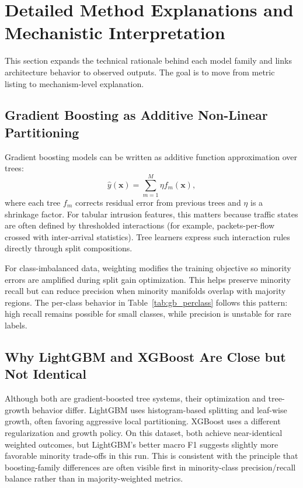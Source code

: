 \documentclass[10pt,journal]{IEEEtran}
\begin{document}
\section{Detailed Method Explanations and Mechanistic Interpretation}
This section expands the technical rationale behind each model family and links architecture behavior to observed outputs. The goal is to move from metric listing to mechanism-level explanation.

\subsection{Gradient Boosting as Additive Non-Linear Partitioning}
Gradient boosting models can be written as additive function approximation over trees:
\begin{equation}
\hat{y}(\mathbf{x}) = \sum_{m=1}^{M}\eta f_m(\mathbf{x}),
\end{equation}
where each tree $f_m$ corrects residual error from previous trees and $\eta$ is a shrinkage factor. For tabular intrusion features, this matters because traffic states are often defined by thresholded interactions (for example, packets-per-flow crossed with inter-arrival statistics). Tree learners express such interaction rules directly through split compositions.

For class-imbalanced data, weighting modifies the training objective so minority errors are amplified during split gain optimization. This helps preserve minority recall but can reduce precision when minority manifolds overlap with majority regions. The per-class behavior in Table~\ref{tab:gb_perclass} follows this pattern: high recall remains possible for small classes, while precision is unstable for rare labels.

\subsection{Why LightGBM and XGBoost Are Close but Not Identical}
Although both are gradient-boosted tree systems, their optimization and tree-growth behavior differ. LightGBM uses histogram-based splitting and leaf-wise growth, often favoring aggressive local partitioning. XGBoost uses a different regularization and growth policy. On this dataset, both achieve near-identical weighted outcomes, but LightGBM's better macro F1 suggests slightly more favorable minority trade-offs in this run. This is consistent with the principle that boosting-family differences are often visible first in minority-class precision/recall balance rather than in majority-weighted metrics.
\end{document}
